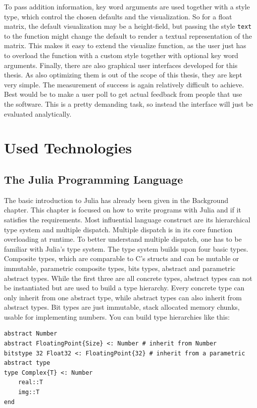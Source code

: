 To pass addition information, key word arguments are used together with a style type, which control the chosen defaults and the visualization.
So for a float matrix, the default visualization may be a height-field, but passing the style \texttt{text} to the function might change the default to render a textual representation of the matrix.
This makes it easy to extend the visualize function, as the user just has to overload the function with a custom style together with optional key word arguments.
Finally, there are also graphical user interfaces developed for this thesis. As also optimizing them is out of the scope of this thesis, they are kept very simple.
The measurement of success is again relatively difficult to achieve.
Best would be to make a user poll to get actual feedback from people that use the software. This is a pretty demanding task, so instead the interface will just be evaluated analytically.


\section{Used Technologies}

\subsection{The Julia Programming Language}

The basic introduction to Julia has already been given in the Background chapter.
This chapter is focused on how to write programs with Julia and if it satisfies the requirements.
Most influential language construct are its hierarchical type system and multiple dispatch.
Multiple dispatch is in its core function overloading at runtime. 
To better understand multiple dispatch, one has to be familiar with Julia's type system.
The type system builds upon four basic types. 
Composite types, which are comparable to C's structs and can be mutable or immutable, parametric composite types, bits types, abstract and parametric abstract types.
While the first three are all concrete types, abstract types can not be instantiated but are used to build a type hierarchy.
Every concrete type can only inherit from one abstract type, while abstract types can also inherit from abstract types.
Bit types are just immutable, stack allocated memory chunks, usable for implementing numbers.
You can build type hierarchies like this:
\begin{lstlisting}
abstract Number
abstract FloatingPoint{Size} <: Number # inherit from Number
bitstype 32 Float32 <: FloatingPoint{32} # inherit from a parametric abstract type
type Complex{T} <: Number
    real::T
    img::T
end
\end{lstlisting}


